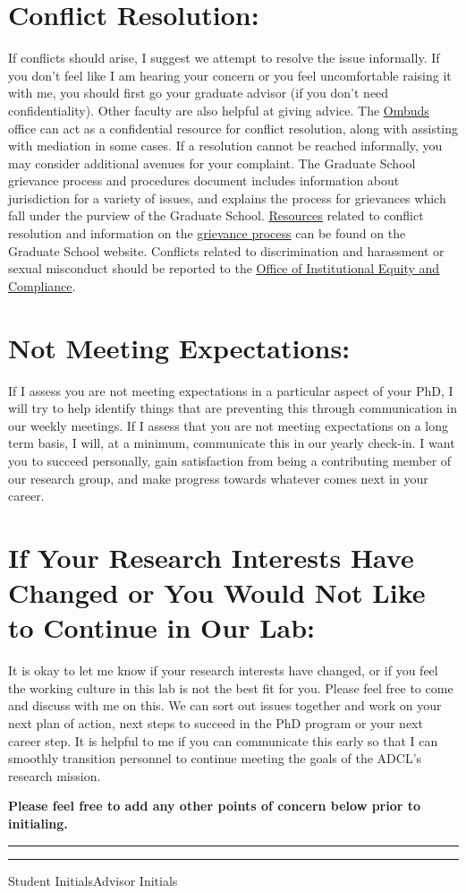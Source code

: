 \documentclass[11pt,letterpaper]{article}
\begin{document}
\section{Conflict Resolution:} If conflicts should arise, I suggest we attempt to resolve the issue informally. If you don't feel like I am hearing your concern or you feel uncomfortable raising it with me, you should first go your graduate advisor (if you don't need confidentiality). Other faculty are also helpful at giving advice. The \href{https://www.colorado.edu/ombuds/}{\ul{Ombuds}} office can act as a confidential resource for conflict resolution, along with assisting with mediation in some cases. If a resolution cannot be reached informally, you may consider additional avenues for your complaint. The Graduate School grievance process and procedures document includes information about jurisdiction for a variety of issues, and explains the process for grievances which fall under the purview of the Graduate School. \href{https://www.colorado.edu/graduateschool/current-students/campus-resources}{\ul{Resources}} related to conflict resolution and information on the \href{https://www.colorado.edu/graduateschool/current-students/graduate-school-policies-and-procedures}{\ul{grievance process}} can be found on the Graduate School website. Conflicts related to discrimination and harassment or sexual misconduct should be reported to the \href{https://www.colorado.edu/oiec/reporting-resolution-options}{\ul{Office of Institutional Equity and Compliance}}.

\section{Not Meeting Expectations:} If I assess you are not meeting expectations in a particular aspect of your PhD, I will try to help identify things that are preventing this through communication in our weekly meetings. If I assess that you are not meeting expectations on a long term basis, I will, at a minimum, communicate this in our yearly check-in. I want you to succeed personally, gain satisfaction from being a contributing member of our research group, and make progress towards whatever comes next in your career.

\section{If Your Research Interests Have Changed or You Would Not Like to Continue in Our Lab:} It is okay to let me know if your research interests have changed, or if you feel the working culture in this lab is not the best fit for you. Please feel free to come and discuss with me on this. We can sort out issues together and work on your next plan of action, next steps to succeed in the PhD program or your next career step. It is helpful to me if you can communicate this early so that I can smoothly transition personnel to continue meeting the goals of the ADCL's research mission.

\textbf{Please feel free to add any other points of concern below prior to initialing.}

\vspace{3em}

\noindent\rule{6cm}{0.4pt}\hfill\rule{6cm}{0.4pt}

\vspace{0.5em}

\noindent Student Initials\hfill Advisor Initials
\end{document}

